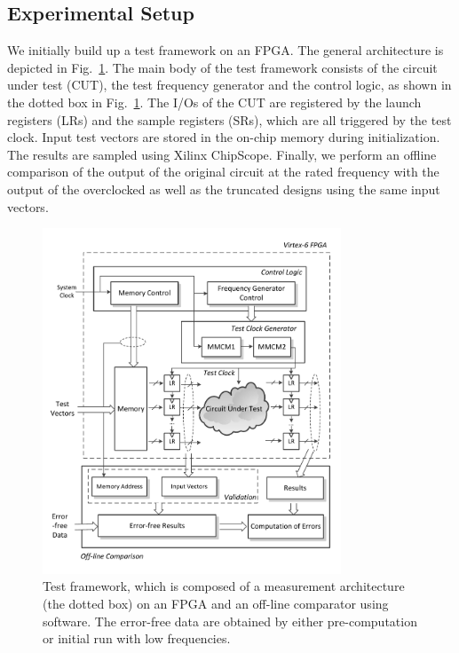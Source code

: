 \documentclass[prodmode,acmtrets]{acmsmall} %
\begin{document}
\subsection{Experimental Setup} \label{sub:experimental_setup}
We initially build up a test framework on an FPGA. The general architecture is depicted in Fig.~\ref{Test Framework}. The main body of the test framework consists of the circuit under test (CUT), the test frequency generator and the control logic, as shown in the dotted box in Fig.~\ref{Test Framework}. The I/Os of the CUT are registered by the launch registers (LRs) and the sample registers (SRs), which are all triggered by the test clock. Input test vectors are stored in the on-chip memory during initialization. The results are sampled using Xilinx ChipScope. Finally, we perform an offline comparison of the output of the original circuit at the rated frequency with the output of the overclocked as well as the truncated designs using the same input vectors.
%
\begin{figure}[htbp]
  \centering
  \vspace{-4ex}
  \includegraphics[width=3.5in]{./Figures/TestFramework.pdf}
  \vspace{-2ex}
  \caption{Test framework, which is composed of a measurement architecture (the dotted box) on an FPGA and an off-line comparator using software. The error-free data are obtained by either pre-computation or initial run with low frequencies.}
  \label{Test Framework}
\end{figure}
\end{document}
